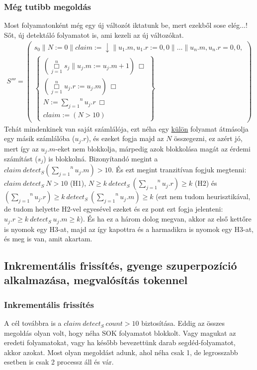 \documentclass{article}
\newcommand{\loopBox}{\overset{n}{\underset{j=1}{\Box}}}
\newcommand{\loopsum}{\overset{n}{\underset{j=1}{\sum}}}
\newcommand{\false}{\downarrow}
\newcommand{\pp}{\parallel}
\begin{document}
\subsubsection*{Még tutibb megoldás}
Most folyamatonként még egy új változót iktatunk be, mert ezekből sose elég...! Sőt, új detektáló folyamatot is, ami kezeli az új változókat.
\begin{align*}
S''' =\left( \begin{array}{l}
s_0 \pp N:=0 \pp claim:= \false \pp u_1.m,u_1.r:=0,0\pp\dots\pp u_n.m,u_n.r = 0,0,\\
\left\{ \begin{array}{l}
(\loopBox s_j \pp u_j.m:=u_j.m+1)\ \Box\\ (\loopBox u_j.r := u_j.m)\ \Box\\ N:=\loopsum u_j.r\ \Box\\ claim:=(N>10)
\end{array}\right\}
\end{array}\right)
\end{align*}
Tehát mindenkinek van saját számlálója, ezt néha egy \underline{külön} folyamat átmásolja egy másik számlálóba ($u_j.r$), és ezeket fogja majd az $N$ összegezni, ez azért jó, mert így az $u_j.m$-eket nem blokkolja, márpedig azok blokkolása magát az érdemi számítást ($s_j$) is blokkolná. Bizonyítandó megint a $claim\ detect_S  (\overset{n}{\underset{j=1}{\sum}} u_j.m)>10$. És ezt megint tranzitívan fogjuk megtenni: $claim\ detect_S\ N>10$ (H1), $N \geq k\ detect_S\ (\overset{n}{\underset{j=1}{\sum}} u_j.r) \geq k$ (H2) és $(\overset{n}{\underset{j=1}{\sum}} u_j.r) \geq k\ detect_S\ (\overset{n}{\underset{j=1}{\sum}} u_j.m) \geq k$ (ezt nem tudom heurisztikával, de tudom helyette H2-vel egyesével ezeket és ez pont ezt fogja jelenteni: $u_j.r \geq k\ detect_S\ u_j.m \geq k$). És ha ez a három dolog megvan, akkor az első kettőre is nyomok egy H3-at, majd az így kapottra és a harmadikra is nyomok egy H3-at, és meg is van, amit akartam.
\newpage
\subsection{Inkrementális frissítés, gyenge szuperpozíció alkalmazása, megvalósítás tokennel }
\subsubsection*{Inkrementális frissítés}
A cél továbbra is a $claim\ detect_S\ count>10$ biztosítása. Eddig az összes megoldás olyan volt, hogy néha SOK folyamatot blokkolt. Vagy magukat az eredeti folyamatokat, vagy ha később bevezettünk darab segdéd-folyamatot, akkor azokat. Most olyan megoldást adunk, ahol néha csak 1, de legrosszabb esetben is csak 2 processz áll és vár.
\end{document}
